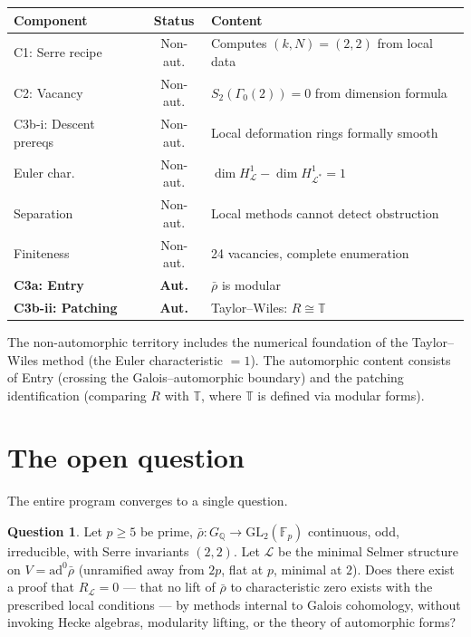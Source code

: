 \documentclass[12pt]{amsart}
\theoremstyle{definition}
\newtheorem{question}[theorem]{Question}
\theoremstyle{remark}
\newcommand{\GL}{\mathrm{GL}}
\newcommand{\ad}{\mathrm{ad}}
\newcommand{\rhobar}{\bar{\rho}}
\newcommand{\Fp}{\mathbb{F}_p}
\newcommand{\GQ}{G_{\mathbb{Q}}}
\begin{document}
\medskip
\begin{center}
\begin{tabular}{l|c|l}
Component & Status & Content \\ \hline
C1: Serre recipe & Non-aut. & Computes $(k,N) = (2,2)$ from local data \\
C2: Vacancy & Non-aut. & $S_2(\Gamma_0(2)) = 0$ from dimension formula \\
C3b-i: Descent prereqs & Non-aut. & Local deformation rings formally smooth \\
Euler char. & Non-aut. & $\dim H^1_{\mathcal{L}} - \dim H^1_{\mathcal{L}^*} = 1$ \\
Separation & Non-aut. & Local methods cannot detect obstruction \\
Finiteness & Non-aut. & 24 vacancies, complete enumeration \\ \hline
\textbf{C3a: Entry} & \textbf{Aut.} & $\rhobar$ is modular \\
\textbf{C3b-ii: Patching} & \textbf{Aut.} & Taylor--Wiles: $R \cong \mathbb{T}$
\end{tabular}
\end{center}
\medskip

The non-automorphic territory includes the numerical foundation of the Taylor--Wiles method (the Euler characteristic $= 1$). The automorphic content consists of Entry (crossing the Galois--automorphic boundary) and the patching identification (comparing $R$ with $\mathbb{T}$, where $\mathbb{T}$ is defined via modular forms).

\section{The open question}
\label{sec:question}

The entire program converges to a single question.

\begin{question}\label{q:main}
Let $p \geq 5$ be prime, $\rhobar : \GQ \to \GL_2(\Fp)$ continuous, odd, irreducible, with Serre invariants $(2, 2)$. Let $\mathcal{L}$ be the minimal Selmer structure on $V = \ad^0\rhobar$ (unramified away from $2p$, flat at $p$, minimal at $2$). Does there exist a proof that $R_{\mathcal{L}} = 0$ --- that no lift of $\rhobar$ to characteristic zero exists with the prescribed local conditions --- by methods internal to Galois cohomology, without invoking Hecke algebras, modularity lifting, or the theory of automorphic forms?
\end{question}
\end{document}

